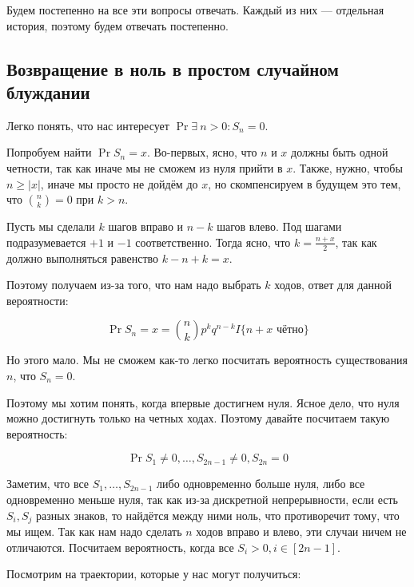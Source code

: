 Будем постепенно на все эти вопросы отвечать. Каждый из них --- отдельная
история, поэтому будем отвечать постепенно.

\subsection{Возвращение в ноль в простом случайном блуждании}

Легко понять, что нас интересует $\Pr{\exists \ n > 0 : S_n = 0}$.

Попробуем найти $\Pr{S_n = x}$. Во-первых, ясно, что $n$ и $x$ должны
быть одной четности, так как иначе мы не сможем из нуля прийти в $x$.
Также, нужно, чтобы $n \geq |x|$, иначе мы просто не дойдём до 
$x$, но скомпенсируем в будущем это тем, что $\binom{n}{k} = 0$ при $k > n$.

Пусть мы сделали $k$ шагов вправо и $n - k$ шагов влево. Под шагами 
подразумевается $+1$ и $-1$ соответственно. Тогда ясно, что
$k = \frac{n + x}{2}$, так как должно выполняться равенство $k - n + k = x$.

Поэтому получаем из-за того, что нам надо выбрать $k$ ходов, ответ для данной вероятности:

\[
  \Pr{S_n = x} = \binom{n}{k}p^kq^{n - k}I\{n + x \text{ чётно}\}
\]

Но этого мало. Мы не сможем как-то легко посчитать вероятность существования $n$, что $S_n = 0$.

Поэтому мы хотим понять, когда впервые достигнем нуля. Ясное дело, что нуля 
можно достигнуть только на четных ходах. Поэтому давайте посчитаем такую
вероятность:

\[
  \Pr{S_1 \neq 0, \ldots, S_{2n - 1} \neq 0, S_{2n} = 0}
\]

Заметим, что все $S_1, \ldots, S_{2n - 1}$ либо одновременно больше нуля,
либо все одновременно меньше нуля, так как из-за дискретной непрерывности,
если есть $S_i, S_j$ разных знаков, то найдётся между ними ноль, что 
противоречит тому, что мы ищем. 
Так как нам надо сделать $n$ ходов вправо и влево, эти случаи ничем не отличаются. Посчитаем вероятность, когда все $S_i > 0, i \in [2n - 1]$.

Посмотрим на траектории, которые у нас могут получиться:

